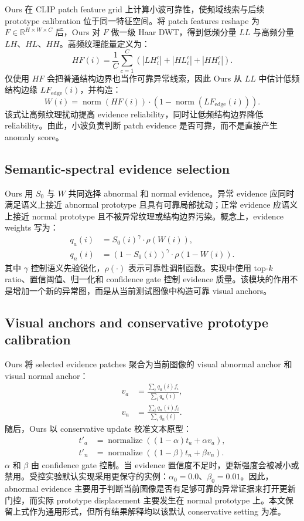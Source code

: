 \documentclass[10pt,a4paper,fontset=none]{ctexart}
\newcommand{\normop}{\operatorname{norm}}
\begin{document}
Ours 在 CLIP patch feature grid 上计算小波可靠性，使频域线索与后续 prototype calibration 位于同一特征空间。将 patch features reshape 为 $F\in\mathbb{R}^{H\times W\times C}$ 后，Ours 对 $F$ 做一级 Haar DWT，得到低频分量 $LL$ 与高频分量 $LH$、$HL$、$HH$。高频纹理能量定义为：
\begin{equation}
HF(i)=\frac{1}{C}\sum_{c=1}^{C}\left(|LH_i^c|+|HL_i^c|+|HH_i^c|\right).
\label{eq:hf}
\end{equation}
仅使用 $HF$ 会把普通结构边界也当作可靠异常线索，因此 Ours 从 $LL$ 中估计低频结构边缘 $LF_{\mathrm{edge}}(i)$，并构造：
\begin{equation}
W(i)=\normop(HF(i))\cdot\left(1-\normop(LF_{\mathrm{edge}}(i))\right).
\label{eq:w}
\end{equation}
该式让高频纹理扰动提高 evidence reliability，同时让低频结构边界降低 reliability。由此，小波负责判断 patch evidence 是否可靠，而不是直接产生 anomaly score。

\subsection{Semantic-spectral evidence selection}

Ours 用 $S_0$ 与 $W$ 共同选择 abnormal 和 normal evidence。异常 evidence 应同时满足语义上接近 abnormal prototype 且具有可靠局部扰动；正常 evidence 应语义上接近 normal prototype 且不被异常纹理或结构边界污染。概念上，evidence weights 写为：
\begin{align}
q_a(i) &= S_0(i)^\gamma \cdot \rho(W(i)), \\
q_n(i) &= (1-S_0(i))^\gamma \cdot \rho(1-W(i)).
\end{align}
其中 $\gamma$ 控制语义先验锐化，$\rho(\cdot)$ 表示可靠性调制函数。实现中使用 top-$k$ ratio、置信阈值、归一化和 confidence gate 控制 evidence 质量。该模块的作用不是增加一个新的异常图，而是从当前测试图像中构造可靠 visual anchors。

\subsection{Visual anchors and conservative prototype calibration}

Ours 将 selected evidence patches 聚合为当前图像的 visual abnormal anchor 和 visual normal anchor：
\begin{align}
v_a &= \frac{\sum_i q_a(i)f_i}{\sum_i q_a(i)}, \\
v_n &= \frac{\sum_i q_n(i)f_i}{\sum_i q_n(i)}.
\end{align}
随后，Ours 以 conservative update 校准文本原型：
\begin{align}
t'_a &= \operatorname{normalize}\left((1-\alpha)t_a+\alpha v_a\right), \\
t'_n &= \operatorname{normalize}\left((1-\beta)t_n+\beta v_n\right).
\end{align}
$\alpha$ 和 $\beta$ 由 confidence gate 控制。当 evidence 置信度不足时，更新强度会被减小或禁用。受控实验默认实现采用更保守的实例：$\alpha_0=0.0$、$\beta_0=0.01$。因此，abnormal evidence 主要用于判断当前图像是否有足够可靠的异常证据来打开更新门控，而实际 prototype displacement 主要发生在 normal prototype 上。本文保留上式作为通用形式，但所有结果解释均以该默认 conservative setting 为准。
\end{document}
